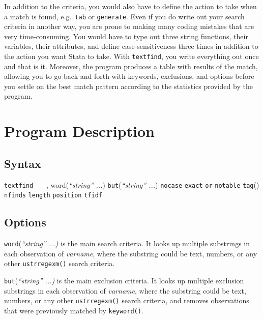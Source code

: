 
In addition to the criteria, you would also have to define the action to take when a match is found, e.g.~{\tt tab} or {\tt generate}. Even if you do write out your search criteria in another way, you are prone to making many coding mistakes that are very time-consuming. You would have to type out three string functions, their variables, their attributes, and define case-sensitiveness three times in addition to the action you want Stata to take. With {\tt textfind}, you write everything out once and that is it. Moreover, the program produces a table with results of the match, allowing you to go back and forth with keywords, exclusions, and options before you settle on the best match pattern according to the statistics provided by the program.

\section[textfind]{Program Description}
\subsection[Syntax]{Syntax}
\begin{stsyntax}
  {\tt textfind}
  \varname\
  \optif\
  \optin\
  \LB,
    {word}({\it ``string'' ...})
    {\tt but}({\it ``string'' ...})
    {\tt nocase}
    {\tt exact}
    {\tt or}
    {\tt notable}
    {\tt tag}(\newvarname)
    {\tt nfinds}
    {\tt length}
    {\tt position}
    {\tt tfidf}\RB
\end{stsyntax}

\subsection[Options]{Options}
\hangpara
{\tt {}word}({\it ``string'' ...)} is the main search criteria. It looks up multiple substrings in each observation of {\it varname}, where the substring could be text, numbers, or any other {\tt ustrregexm()} search criteria.

\hangpara
{\tt but}({\it ``string'' ...)} is the main exclusion criteria. It looks up multiple exclusion substrings in each observation of {\it varname}, where the substring could be text, numbers, or any other {\tt ustrregexm()} search criteria, and removes observations that were previously matched by {\tt keyword()}. \\

